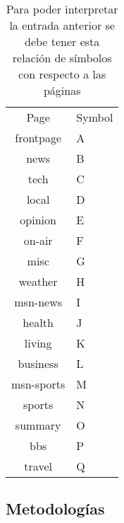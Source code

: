 \begin{table}[]
	\centering
	\caption{Para poder interpretar la entrada anterior se debe tener esta relación de símbolos con respecto a las páginas}
	\label{my-label}
	\begin{tabular}{cl}
		Page       & Symbol \\ \cline{1-2}
		frontpage  & A      \\
		news       & B      \\
		tech       & C      \\
		local      & D      \\
		opinion    & E      \\
		on-air     & F      \\
		misc       & G      \\
		weather    & H      \\
		msn-news   & I      \\
		health     & J      \\
		living     & K      \\
		business   & L      \\
		msn-sports & M      \\
		sports     & N      \\
		summary    & O      \\
		bbs        & P      \\
		travel     & Q      \\ 
	\end{tabular}
\end{table}


 








\subsection{Metodologías}





